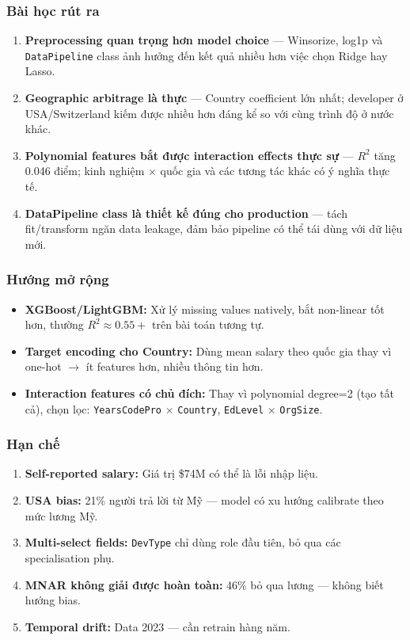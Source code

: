 \subsubsection{Bài học rút ra}

\begin{enumerate}
    \item \textbf{Preprocessing quan trọng hơn model choice} — Winsorize, log1p và
        \texttt{DataPipeline} class ảnh hưởng đến kết quả nhiều hơn việc chọn Ridge hay Lasso.
    \item \textbf{Geographic arbitrage là thực} — Country coefficient lớn nhất;
        developer ở USA/Switzerland kiếm được nhiều hơn đáng kể so với cùng trình độ
        ở nước khác.
    \item \textbf{Polynomial features bắt được interaction effects thực sự} —
        $R^2$ tăng 0.046 điểm; kinh nghiệm $\times$ quốc gia và các tương tác khác
        có ý nghĩa thực tế.
    \item \textbf{DataPipeline class là thiết kế đúng cho production} — tách
        fit/transform ngăn data leakage, đảm bảo pipeline có thể tái dùng với dữ liệu mới.
\end{enumerate}

\subsubsection{Hướng mở rộng}

\begin{itemize}
    \item \textbf{XGBoost/LightGBM:} Xử lý missing values natively, bắt non-linear tốt
        hơn, thường $R^2 \approx 0.55+$ trên bài toán tương tự.
    \item \textbf{Target encoding cho Country:} Dùng mean salary theo quốc gia thay vì
        one-hot $\to$ ít features hơn, nhiều thông tin hơn.
    \item \textbf{Interaction features có chủ đích:} Thay vì polynomial degree=2
        (tạo tất cả), chọn lọc: \texttt{YearsCodePro} $\times$ \texttt{Country},
        \texttt{EdLevel} $\times$ \texttt{OrgSize}.
\end{itemize}

\subsubsection{Hạn chế}

\begin{enumerate}
    \item \textbf{Self-reported salary:} Giá trị \$74M có thể là lỗi nhập liệu.
    \item \textbf{USA bias:} 21\% người trả lời từ Mỹ — model có xu hướng calibrate
        theo mức lương Mỹ.
    \item \textbf{Multi-select fields:} \texttt{DevType} chỉ dùng role đầu tiên,
        bỏ qua các specialisation phụ.
    \item \textbf{MNAR không giải được hoàn toàn:} 46\% bỏ qua lương —
        không biết hướng bias.
    \item \textbf{Temporal drift:} Data 2023 — cần retrain hàng năm.
\end{enumerate}
\pagebreak
